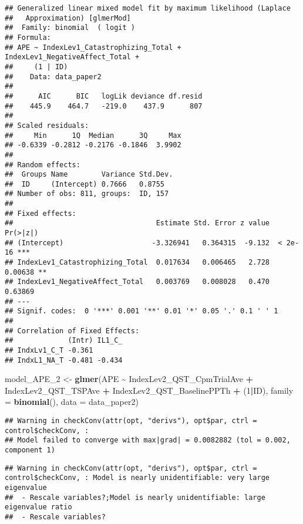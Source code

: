 \documentclass[
  12pt,
]{article}
\newenvironment{Shaded}{\begin{snugshade}}{\end{snugshade}}
\newcommand{\AttributeTok}[1]{\textcolor[rgb]{0.13,0.29,0.53}{#1}}
\newcommand{\DecValTok}[1]{\textcolor[rgb]{0.00,0.00,0.81}{#1}}
\newcommand{\FunctionTok}[1]{\textcolor[rgb]{0.13,0.29,0.53}{\textbf{#1}}}
\newcommand{\NormalTok}[1]{#1}
\newcommand{\OtherTok}[1]{\textcolor[rgb]{0.56,0.35,0.01}{#1}}
\newcommand{\SpecialCharTok}[1]{\textcolor[rgb]{0.81,0.36,0.00}{\textbf{#1}}}
\begin{document}
\begin{verbatim}
## Generalized linear mixed model fit by maximum likelihood (Laplace
##   Approximation) [glmerMod]
##  Family: binomial  ( logit )
## Formula: 
## APE ~ IndexLev1_Catastrophizing_Total + IndexLev1_NegativeAffect_Total +  
##     (1 | ID)
##    Data: data_paper2
## 
##      AIC      BIC   logLik deviance df.resid 
##    445.9    464.7   -219.0    437.9      807 
## 
## Scaled residuals: 
##     Min      1Q  Median      3Q     Max 
## -0.6339 -0.2812 -0.2176 -0.1846  3.9902 
## 
## Random effects:
##  Groups Name        Variance Std.Dev.
##  ID     (Intercept) 0.7666   0.8755  
## Number of obs: 811, groups:  ID, 157
## 
## Fixed effects:
##                                  Estimate Std. Error z value Pr(>|z|)    
## (Intercept)                     -3.326941   0.364315  -9.132  < 2e-16 ***
## IndexLev1_Catastrophizing_Total  0.017634   0.006465   2.728  0.00638 ** 
## IndexLev1_NegativeAffect_Total   0.003769   0.008028   0.470  0.63869    
## ---
## Signif. codes:  0 '***' 0.001 '**' 0.01 '*' 0.05 '.' 0.1 ' ' 1
## 
## Correlation of Fixed Effects:
##             (Intr) IL1_C_
## IndxLv1_C_T -0.361       
## IndxL1_NA_T -0.481 -0.434
\end{verbatim}

\begin{Shaded}
\begin{Highlighting}[]
\NormalTok{model\_APE\_2 }\OtherTok{\textless{}{-}} \FunctionTok{glmer}\NormalTok{(APE }\SpecialCharTok{\textasciitilde{}}\NormalTok{ IndexLev2\_QST\_CpmTrialAve }\SpecialCharTok{+}\NormalTok{ IndexLev2\_QST\_TSPAve }\SpecialCharTok{+}\NormalTok{ IndexLev2\_QST\_BaselinePPTh }\SpecialCharTok{+}\NormalTok{ (}\DecValTok{1}\SpecialCharTok{|}\NormalTok{ID), }\AttributeTok{family =} \FunctionTok{binomial}\NormalTok{(), }\AttributeTok{data =}\NormalTok{ data\_paper2)}
\end{Highlighting}
\end{Shaded}

\begin{verbatim}
## Warning in checkConv(attr(opt, "derivs"), opt$par, ctrl = control$checkConv, :
## Model failed to converge with max|grad| = 0.0082882 (tol = 0.002, component 1)
\end{verbatim}

\begin{verbatim}
## Warning in checkConv(attr(opt, "derivs"), opt$par, ctrl = control$checkConv, : Model is nearly unidentifiable: very large eigenvalue
##  - Rescale variables?;Model is nearly unidentifiable: large eigenvalue ratio
##  - Rescale variables?
\end{verbatim}
\end{document}
